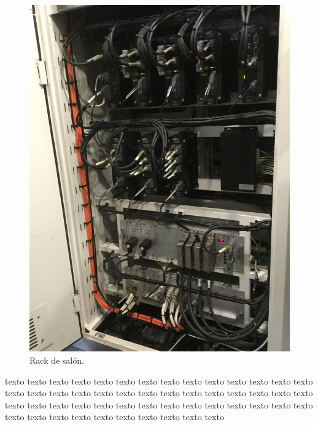 \documentclass[
11pt, %
]{charter}
\begin{document}
\begin{figure}[htpb]
\centering 
\includegraphics[width=1\textwidth, angle=90]{./Pics/IMG_4560.JPG}
\caption{Rack de salón.}
\label{fig:rack Salon}
\end{figure}

texto texto texto texto texto texto texto texto texto texto texto texto texto texto texto texto texto texto texto texto texto texto texto texto texto texto texto texto texto texto texto texto texto texto texto texto texto texto texto texto texto texto texto texto texto texto texto texto texto texto texto texto 
\end{document}
